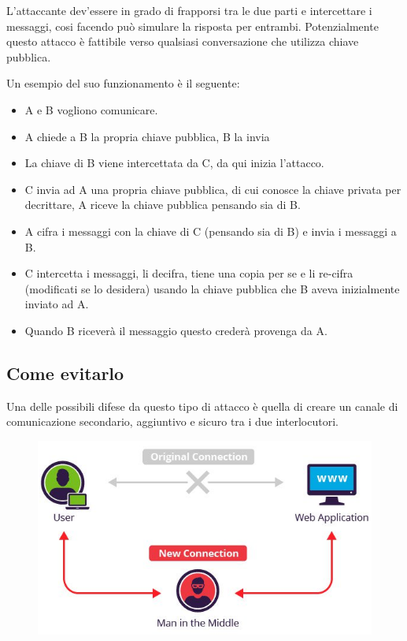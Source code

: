 L’attaccante dev’essere in grado di frapporsi tra le due parti e intercettare i messaggi, cosi facendo può simulare la risposta per entrambi.
Potenzialmente questo attacco è fattibile verso qualsiasi conversazione che utilizza chiave pubblica.


Un esempio del suo funzionamento è il seguente:
\begin{itemize}
\item	A e B vogliono comunicare.
\item	A chiede a B la propria chiave pubblica, B la invia
\item	La chiave di B viene intercettata da C, da qui inizia l’attacco.
\item	C invia ad A una propria chiave pubblica, di cui conosce la chiave privata per decrittare, A riceve la chiave pubblica pensando sia di B.
\item	A cifra i messaggi con la chiave di C (pensando sia di B) e invia i messaggi a B.
\item	C intercetta i messaggi, li decifra, tiene una copia per se e li re-cifra (modificati se lo desidera) usando la chiave pubblica che B aveva inizialmente inviato ad A.
\item	Quando B riceverà il messaggio questo crederà provenga da A.
\end{itemize}

\subsection{Come evitarlo}
Una delle possibili difese da questo tipo di attacco è quella di creare un canale di comunicazione secondario, aggiuntivo e sicuro tra i due interlocutori.

\begin{figure}[H]
\centering
\includegraphics[scale=0.6]{res/img/64_MITM.png}
\end{figure}


